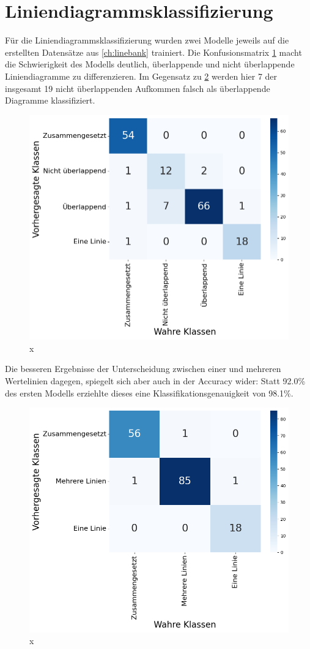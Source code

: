 \section{Liniendiagrammsklassifizierung}

Für die Liniendiagrammsklassifizierung wurden zwei Modelle jeweils auf die erstellten Datensätze aus \ref{ch:linebank} trainiert. Die Konfusionsmatrix \ref{fig:val_v1_matrix} macht die Schwierigkeit des Modells deutlich, überlappende und nicht überlappende Liniendiagramme zu differenzieren. Im Gegensatz zu \ref{fig:val_v2_matrix} werden hier 7 der insgesamt 19 nicht überlappenden Aufkommen falsch als überlappende Diagramme klassifiziert.

\begin{figure}[h!]
    \centering
    \captionsetup{width=.75\linewidth}
    \includegraphics[width=.75\textwidth]{Experimente/img/classify/val_v1/matrix.png}
    \caption{ x}
    \label{fig:val_v1_matrix}
\end{figure}

Die besseren Ergebnisse der Unterscheidung zwischen einer und mehreren Wertelinien dagegen, spiegelt sich aber auch in der Accuracy wider: Statt 92.0\% des ersten Modells erziehlte dieses eine Klassifikationsgenauigkeit von 98.1\%.

\begin{figure}[h!]
    \centering
    \captionsetup{width=.75\linewidth}
    \includegraphics[width=.75\textwidth]{Experimente/img/classify/val_v2/matrix.png}
    \caption{ x}
    \label{fig:val_v2_matrix}
\end{figure}

